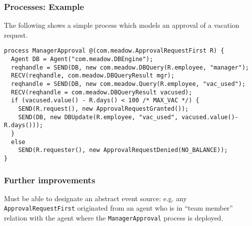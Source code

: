 \documentclass{beamer}
\begin{document}
\begin{frame}[fragile]
\frametitle{Processes: Example}

The following shows a simple process which models an approval of a vacation
request. 

{\scriptsize
\begin{verbatim}
process ManagerApproval @(com.meadow.ApprovalRequestFirst R) {
  Agent DB = Agent("com.meadow.DBEngine");
  reqhandle = SEND(DB, new com.meadow.DBQuery(R.employee, "manager");
  RECV(reqhandle, com.meadow.DBQueryResult mgr);
  reqhandle = SEND(DB, new com.meadow.Query(R.employee, "vac_used");
  RECV(reqhandle = com.meadow.DBQueryResult vacused);
  if (vacused.value() - R.days() < 100 /* MAX_VAC */) {
    SEND(R.request(), new ApprovalRequestGranted());
    SEND(DB, new DBUpdate(R.employee, "vac_used", vacused.value()-R.days()));
  }
  else
    SEND(R.requester(), new ApprovalRequestDenied(NO_BALANCE));
}
\end{verbatim}
}

\end{frame}


\begin{frame}[fragile]
\frametitle{Further improvements}

\bit
\w Must be able to designate an abstract event source: e.g. any
{\tt ApprovalRequestFirst} originated from an agent who is in ``team member''
relation with the agent where the {\tt ManagerApproval} process is deployed.
\eit

\end{frame}

\end{document}
